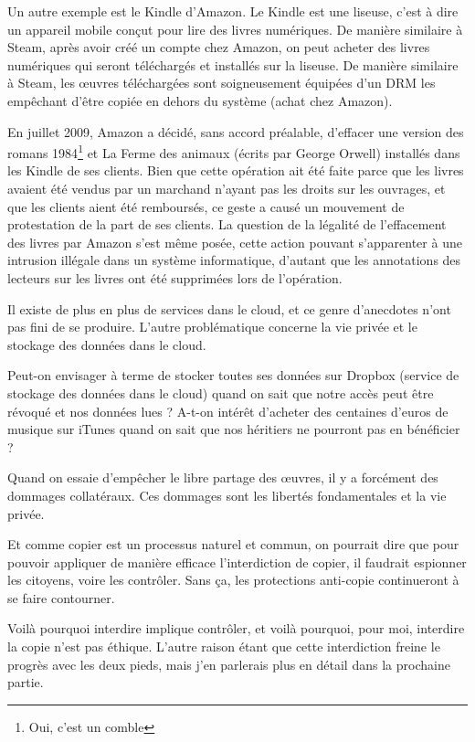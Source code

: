 Un autre exemple est le Kindle d'Amazon.
Le Kindle est une liseuse, c'est à dire un appareil mobile conçut pour lire des livres numériques.
De manière similaire à Steam, après avoir créé un compte chez Amazon, on peut acheter des livres numériques qui seront téléchargés et installés sur la liseuse.
De manière similaire à Steam, les œuvres téléchargées sont soigneusement équipées d'un DRM les empêchant d'être copiée en dehors du système (achat chez Amazon).

En juillet 2009, Amazon a décidé, sans accord préalable, d'effacer une version des romans 1984\footnote{Oui, c'est un comble} et La Ferme des animaux (écrits par George Orwell) installés dans les Kindle de ses clients.
Bien que cette opération ait été faite parce que les livres avaient été vendus par un marchand n'ayant pas les droits sur les ouvrages, et que les clients aient été remboursés, ce geste a causé un mouvement de protestation de la part de ses clients.
La question de la légalité de l'effacement des livres par Amazon s'est même posée, cette action pouvant s'apparenter à une intrusion illégale dans un système informatique, d'autant que les annotations des lecteurs sur les livres ont été supprimées lors de l'opération.

Il existe de plus en plus de services dans le cloud, et ce genre d'anecdotes n'ont pas fini de se produire.
L'autre problématique concerne la vie privée et le stockage des données dans le cloud.

Peut-on envisager à terme de stocker toutes ses données sur Dropbox (service de stockage des données dans le cloud) quand on sait que notre accès peut être révoqué et nos données lues ?
A-t-on intérêt d'acheter des centaines d'euros de musique sur iTunes quand on sait que nos héritiers ne pourront pas en bénéficier ?

Quand on essaie d'empêcher le libre partage des œuvres, il y a forcément des dommages collatéraux.
Ces dommages sont les libertés fondamentales et la vie privée.

Et comme copier est un processus naturel et commun, on pourrait dire que pour pouvoir appliquer de manière efficace l'interdiction de copier, il faudrait espionner les citoyens, voire les contrôler.
Sans ça, les protections anti-copie continueront à se faire contourner.

Voilà pourquoi interdire implique contrôler, et voilà pourquoi, pour moi, interdire la copie n'est pas éthique.
L'autre raison étant que cette interdiction freine le progrès avec les deux pieds, mais j'en parlerais plus en détail dans la prochaine partie.

